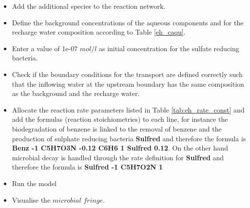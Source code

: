 \begin{itemize}

\item Add the additional species to the reaction network.

\item Define the background concentrations of the aqueous components
and for the recharge water composition according to Table \ref{eh_caqu}.

\item Enter a value of 1e-07 $mol/l$ as initial concentration for 
the sulfate reducing bacteria. 

\item Check if the boundary conditions for the transport are defined correctly 
such that the inflowing water at the upstream boundary has the same composition
as the background and the recharge water.  

\item Allocate the reaction rate parameters listed in 
Table \ref{tab:eh_rate_const} and add the formulas (reaction stoichiometries)
to each line, for instance the biodegradation of benzene 
is linked to the removal of benzene and the production of sulphate reducing bacteria
{\color{red} \textbf{Sulfred}} and therefore the formula is
{\color{red} \textbf{Benz -1 C5H7O3N -0.12 C6H6 1 Sulfred 0.12}}.
On the other hand microbial decay is handled through the rate definition 
for {\color{red} \textbf{Sulfred}} and therefore 
the formula is {\color{red} \textbf{ Sulfred -1 C5H7O2N 1}}

\item Run the model

\item Visualise the $microbial$ $fringe$.

\end{itemize}

